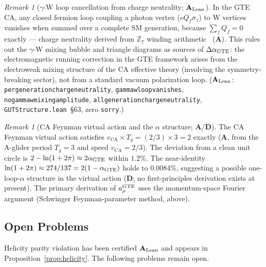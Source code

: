\documentclass[11pt]{article}
\theoremstyle{remark}
\newtheorem{remark}[theorem]{Remark}
\newcommand{\lean}[1]{%
  \penalty-100
  \begingroup\def\_{\textunderscore\allowbreak}\texttt{#1}\endgroup}
\newcommand{\CatA}{\textbf{A}}
\newcommand{\CatAL}{\ensuremath{\textbf{A}_{\rm Lean}}}
\newcommand{\CatD}{\textbf{D}}
\begin{document}
\begin{remark}[$\gamma$-W loop cancellation from charge neutrality; $\CatAL$]
\label{rem:gamma_w_loop_cancellation}
In the GTE CA, any closed fermion loop coupling a photon vertex ($e Q_f \sigma_z$) to
W vertices vanishes when summed over a complete SM generation, because $\sum_f Q_f = 0$
exactly --- charge neutrality derived from $\mathbb{Z}_7$ winding
arithmetic~\cite{SpivackUGP} (\CatA).
This rules out the $\gamma$-W mixing bubble and triangle diagrams as sources of
$\Delta\alpha_{\rm GTE}$: the electromagnetic running correction in the GTE framework
arises from the electroweak mixing structure of the CA effective theory (involving the
symmetry-breaking sector), not from a standard vacuum polarization loop.
(\CatAL: \lean{per\_generation\_charge\_neutrality},
\lean{gamma\_w\_loop\_vanishes},
\lean{no\_gamma\_w\_mixing\_amplitude},
\lean{all\_generation\_charge\_neutrality},
\texttt{GUTStructure.lean}~\S63, zero \texttt{sorry}.)
\end{remark}

\begin{remark}[CA Feynman virtual action and the $\alpha$ structure; $\CatA/\CatD$]
\label{rem:virtual_action_alpha}
The CA Feynman virtual action satisfies $v_{\mathrm{CA}} \times T_g = (2/3) \times 3 = 2$
exactly ($\CatA$, from the A-glider period $T_g = 3$ and speed $v_{\mathrm{CA}} = 2/3$).
The deviation from a clean unit circle is $2 - \ln(1 + 2\pi) \approx 2\alpha_{\rm GTE}$
within $1.2\%$.
The near-identity $\ln(1 + 2\pi) \approx 274/137 = 2(1 - \alpha_{\rm GTE})$ holds to
$0.0084\%$, suggesting a possible one-loop-$\alpha$ structure in the virtual action
($\CatD$; no first-principles derivation exists at present).
The primary derivation of $a_\mu^{\rm GTE}$ uses the momentum-space Fourier argument
(Schwinger Feynman-parameter method, above).
\end{remark}

\subsection{Open Problems}
\label{sec:open_problems}

Helicity parity violation has been certified $\CatAL$ and appears in
Proposition~\ref{prop:helicity}. The following problems remain open.
\end{document}
